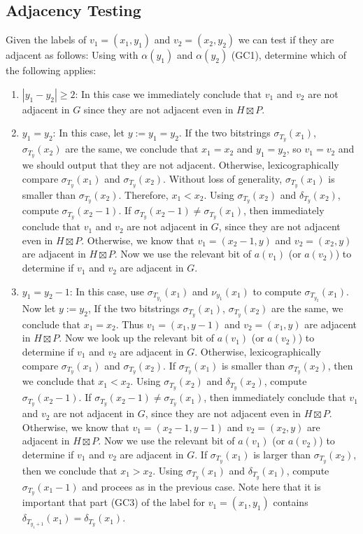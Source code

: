 \documentclass[kpfonts]{patmorin}
\let\ge\geqslant
\begin{document}
\subsection{Adjacency Testing}

Given the labels of $v_1=(x_1,y_1)$ and $v_2=(x_2,y_2)$ we can test if they are adjacent as follows: Using  with $\alpha(y_1)$ and $\alpha(y_2)$ (GC1), determine which of the following applies:
\begin{enumerate}
  \item $|y_1-y_2|\ge 2$: In this case we immediately conclude that $v_1$ and $v_2$ are not adjacent in $G$ since they are not adjacent even in $H\boxtimes P$. %
  
  \item $y_1=y_2$: In this case, let $y:=y_1=y_2$.
  If the two bitstrings $\sigma_{T_y}(x_1)$, $\sigma_{T_y}(x_2)$ are the same, 
  we conclude that $x_1=x_2$ and $y_1=y_2$, so $v_1=v_2$ and we should output that they are not adjacent.
  Otherwise, 
  lexicographically compare $\sigma_{T_y}(x_1)$ and $\sigma_{T_y}(x_2)$. 
  Without loss of generality, $\sigma_{T_y}(x_1)$ is smaller than $\sigma_{T_y}(x_2)$. 
  Therefore, $x_1<x_2$. 
  Using $\sigma_{T_y}(x_2)$ and $\delta_{T_y}(x_2)$, compute $\sigma_{T_y}(x_2-1)$.  If $\sigma_{T_y}(x_2-1)\neq \sigma_{T_y}(x_1)$, then immediately conclude that $v_1$ and $v_2$ are not adjacent in $G$, since they are not adjacent even in $H\boxtimes P$.  Otherwise, we know that 
  $v_1=(x_2-1,y)$ and $v_2=(x_2,y)$ are adjacent in $H\boxtimes P$.
  Now we use the relevant bit of $a(v_1)$ (or $a(v_2)$) to determine if $v_1$ and $v_2$ are adjacent in $G$.
  
  \item $y_1=y_2-1$: 
  In this case, use $\sigma_{T_{y_1}}(x_1)$ and $\nu_{y_1}(x_1)$ to compute $\sigma_{T_{y_2}}(x_1)$. 
  Now let $y:=y_2$, 
  If the two bitstrings $\sigma_{T_y}(x_1)$, $\sigma_{T_y}(x_2)$ are the same, 
  we conclude that $x_1=x_2$. Thus $v_1=(x_1,y-1)$ and $v_2=(x_1,y)$ are adjacent in $H \boxtimes P$.
  Now we look up the relevant bit of $a(v_1)$ (or $a(v_2)$) to determine 
  if $v_1$ and $v_2$ are adjacent in $G$.
  Otherwise, lexicographically compare $\sigma_{T_y}(x_1)$ and $\sigma_{T_y}(x_2)$. 
  If $\sigma_{T_y}(x_1)$ is smaller than $\sigma_{T_y}(x_2)$, then we conclude that $x_1<x_2$.
  Using $\sigma_{T_y}(x_2)$ and $\delta_{T_y}(x_2)$, compute $\sigma_{T_y}(x_2-1)$.  
  If $\sigma_{T_y}(x_2-1)\neq \sigma_{T_y}(x_1)$, then immediately conclude that $v_1$ and $v_2$ are not adjacent in $G$, since they are not adjacent even in $H\boxtimes P$.  Otherwise, we know that 
  $v_1=(x_2-1,y-1)$ and $v_2=(x_2,y)$ are adjacent in $H\boxtimes P$.
  Now we use the relevant bit of $a(v_1)$ (or $a(v_2)$) to determine if $v_1$ and $v_2$ are adjacent in $G$.
  If $\sigma_{T_y}(x_1)$ is larger than $\sigma_{T_y}(x_2)$, then we conclude that $x_1>x_2$.
  Using $\sigma_{T_y}(x_1)$ and $\delta_{T_y}(x_1)$, compute $\sigma_{T_y}(x_1-1)$ and procees as in the previous case. 
  Note here that it is important that part (GC3) of the label for $v_1=(x_1,y_1)$ contains $\delta_{T_{y_1+1}}(x_1)=\delta_{T_{y}}(x_1)$.
  

\end{enumerate}
\end{document}

